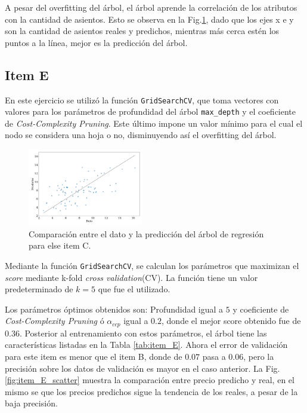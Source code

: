 A pesar del overfitting del árbol, el árbol aprende la correlación de los atributos con la cantidad de asientos. Esto se observa en la Fig.\ref{fig:item_C_scatter}, dado que los ejes x e y son la cantidad de asientos reales y predichos, mientras más cerca estén los puntos a la línea, mejor es la predicción del árbol.

\subsection*{Item E}


En este ejercicio se utilizó  la función  \verb|GridSearchCV|, que toma vectores con valores para los parámetros de profundidad del árbol \verb|max_depth| y el coeficiente de  \emph{Cost-Complexity Pruning}. Este último impone un valor mínimo para el cual el nodo se considera una hoja o no, disminuyendo así el overfitting del árbol. 
\begin{figure}[H]
	\begin{small}
		\begin{center}
			\includegraphics[width=0.45\textwidth]{figures/fit_C_tree.pdf}
		\end{center}
		\caption{Comparación entre el dato y la predicción del árbol de regresión para else item C.}
		\label{fig:item_C_scatter}
	\end{small}
\end{figure}

Mediante la función \verb|GridSearchCV|, se calculan los parámetros que maximizan el \emph{score} mediante k-fold \emph{cross validation}(CV). La función tiene un valor predeterminado de $k=5$ que fue el utilizado.

Los parámetros óptimos obtenidos son: Profundidad igual a $5$ y coeficiente de  \emph{Cost-Complexity Pruning} ó $\alpha_{ccp}$ igual a $0.2$, donde el mejor  score obtenido  fue de $0.36$. Posterior al entrenamiento con estos parámetros, el árbol tiene las características listadas en la Tabla \ref{tab:item_E}. Ahora el error de validación para este item es menor que el item B, donde  de $0.07$ pasa a $0.06$, pero la precisión sobre los datos de validación es mayor en el  caso anterior. La Fig.\ref{fig:item_E_scatter} muestra la comparación entre precio predicho y real, en el mismo se que los precios predichos sigue la tendencia de los reales, a pesar de la baja precisión.

